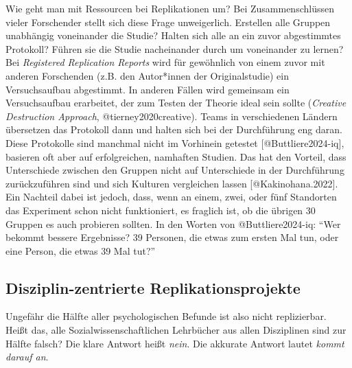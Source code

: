 \documentclass[
  letterpaper,
  DIV=11,
  numbers=noendperiod]{scrreprt}
\begin{document}
\begin{tcolorbox}[enhanced jigsaw, bottomrule=.15mm, toprule=.15mm, opacitybacktitle=0.6, breakable, colback=white, coltitle=black, bottomtitle=1mm, toptitle=1mm, titlerule=0mm, title=\textcolor{quarto-callout-note-color}{\faInfo}\hspace{0.5em}{Effiziente Nutzung von Ressourcen?}, rightrule=.15mm, arc=.35mm, opacityback=0, leftrule=.75mm, left=2mm, colbacktitle=quarto-callout-note-color!10!white, colframe=quarto-callout-note-color-frame]

Wie geht man mit Ressourcen bei Replikationen um? Bei Zusammenschlüssen
vieler Forschender stellt sich diese Frage unweigerlich. Erstellen alle
Gruppen unabhängig voneinander die Studie? Halten sich alle an ein zuvor
abgestimmtes Protokoll? Führen sie die Studie nacheinander durch um
voneinander zu lernen? Bei \emph{Registered Replication Reports} wird
für gewöhnlich von einem zuvor mit anderen Forschenden (z.B. den
Autor*innen der Originalstudie) ein Versuchsaufbau abgestimmt. In
anderen Fällen wird gemeinsam ein Versuchsaufbau erarbeitet, der zum
Testen der Theorie ideal sein sollte (\emph{Creative Destruction
Approach}, @tierney2020creative). Teams in verschiedenen Ländern
übersetzen das Protokoll dann und halten sich bei der Durchführung eng
daran. Diese Protokolle sind manchmal nicht im Vorhinein getestet
{[}@Buttliere2024-iq{]}, basieren oft aber auf erfolgreichen, namhaften
Studien. Das hat den Vorteil, dass Unterschiede zwischen den Gruppen
nicht auf Unterschiede in der Durchführung zurückzuführen sind und sich
Kulturen vergleichen lassen {[}@Kakinohana.2022{]}. Ein Nachteil dabei
ist jedoch, dass, wenn an einem, zwei, oder fünf Standorten das
Experiment schon nicht funktioniert, es fraglich ist, ob die übrigen 30
Gruppen es auch probieren sollten. In den Worten von @Buttliere2024-iq:
``Wer bekommt bessere Ergebnisse? 39 Personen, die etwas zum ersten Mal
tun, oder eine Person, die etwas 39 Mal tut?''

\end{tcolorbox}

\subsection{Disziplin-zentrierte
Replikationsprojekte}\label{disziplin-zentrierte-replikationsprojekte}

Ungefähr die Hälfte aller psychologischen Befunde ist also nicht
replizierbar. Heißt das, alle Sozialwissenschaftlichen Lehrbücher aus
allen Disziplinen sind zur Hälfte falsch? Die klare Antwort heißt
\emph{nein}. Die akkurate Antwort lautet \emph{kommt darauf an}.
\end{document}
